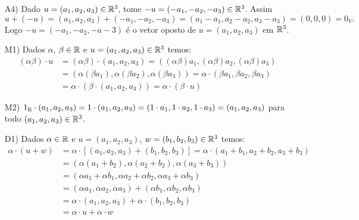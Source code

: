 \begin{exemplo}
\begin{enumerate}[label={\arabic*})]
\begin{solucao}
\begin{enumerate}
				      \item[A4)] Dado $u = (a_1, a_2, a_3) \in \mathbb{R}^3$, tome $-u = (-a_1, -a_2, -a_3) \in \mathbb{R}^3$. Assim
					      \[
						      u + (-u) = (a_1, a_2, a_3) + (-a_1, -a_2, -a_3) = (a_1 - a_1, a_2 - a_2, a_3 - a_3) = (0, 0, 0) = 0_V.
					      \]
					      Logo $-u = (-a_1, -a_2, -a-3)$ é o vetor oposto de $u = (a_1, a_2, a_3)$ em $\mathbb{R}^3$.

				      \item[M1)] Dados $\alpha$, $\beta \in \mathbb{R}$ e $u = (a_1, a_2, a_3) \in \mathbb{R}^3$ temos:
					      \begin{align*}
						      (\alpha\beta)\cdot u & = (\alpha \beta)\cdot (a_1, a_2, a_3) = ((\alpha\beta)a_1, (\alpha\beta)a_2, (\alpha\beta)a_3) \\ &= (\alpha(\beta a_1), \alpha(\beta a_2), \alpha(\beta a_3)) = \alpha\cdot(\beta a_1, \beta a_2, \beta a_3)\\ & = \alpha\cdot(\beta\cdot(a_1, a_2, a_3)) = \alpha\cdot(\beta\cdot u)
					      \end{align*}

				      \item[M2)] $1_{\mathbb{R}} \cdot (a_1, a_2, a_3) = 1 \cdot (a_1, a_2, a_3) = (1\cdot a_1, 1\cdot a_2, 1\cdot a_3) = (a_1, a_2, a_3)$ para todo $(a_1, a_2, a_3) \in \mathbb{R}^3$.

				      \item[D1)] Dados $\alpha \in \mathbb{R}$ e $u = (a_1, a_2, a_3)$, $w = (b_1, b_2, b_3) \in \mathbb{R}^3$ temos:
					      \begin{align*}
						      \alpha\cdot(u + w) & = \alpha\cdot[(a_1, a_2, a_3) + (b_1, b_2, b_3)] = \alpha\cdot(a_1 + b_1, a_2 + b_2, a_3 + b_3) \\ &= (\alpha(a_1 + b_2), \alpha(a_2 + b_2), \alpha(a_3 + b_3))\\ &= (\alpha a_1 + \alpha b_1, \alpha a_2 + \alpha b_2, \alpha a_3 + \alpha b_3) \\ &= (\alpha a_1, \alpha a_2, \alpha a_3) + (\alpha b_1, \alpha b_2, \alpha b_3)\\ &= \alpha\cdot(a_1, a_2, a_3) + \alpha\cdot(b_1, b_2, b_3) \\ &= \alpha\cdot u + \alpha\cdot w
					      \end{align*}


\end{enumerate}
\end{solucao}
\end{enumerate}
\end{exemplo}

